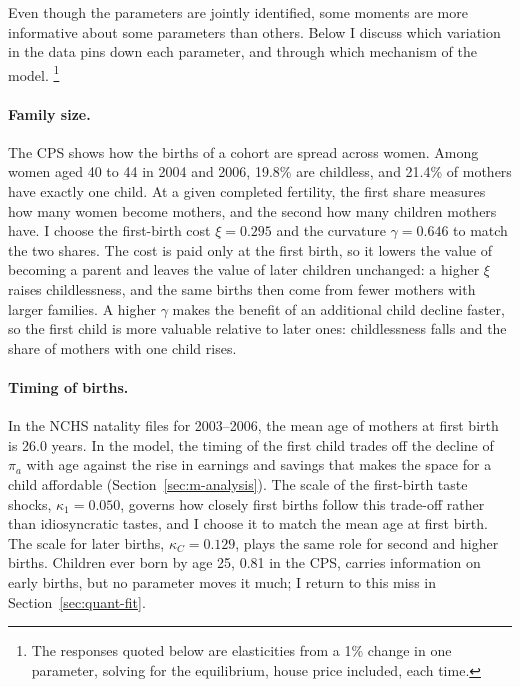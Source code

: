 Even though the parameters are jointly identified, some moments are more
informative about some parameters than others. Below I discuss which
variation in the data pins down each parameter, and through which mechanism
of the model.%
\footnote{The responses quoted below are elasticities from a 1\% change in
one parameter, solving for the equilibrium, house price included, each
time.}

\paragraph{Family size.}
The CPS shows how the births of a cohort are spread across women. Among
women aged 40 to 44 in 2004 and 2006, 19.8\% are childless, and 21.4\% of
mothers have exactly one child. At a given completed fertility, the first
share measures how many women become mothers, and the second how many
children mothers have. I choose the first-birth cost $\xi=0.295$ and the
curvature $\gamma=0.646$ to match the two shares. The cost is paid only at
the first birth, so it lowers the value of becoming a parent and leaves the
value of later children unchanged: a higher $\xi$ raises childlessness, and
the same births then come from fewer mothers with larger families. A higher
$\gamma$ makes the benefit of an additional child decline faster, so the
first child is more valuable relative to later ones: childlessness falls and
the share of mothers with one child rises.

\paragraph{Timing of births.}
In the NCHS natality files for 2003--2006, the mean age of mothers at first
birth is 26.0 years. In the model, the timing of the first child trades off
the decline of $\pi_a$ with age against the rise in earnings and savings
that makes the space for a child affordable (Section~\ref{sec:m-analysis}).
The scale of the first-birth taste shocks, $\kappa_1=0.050$, governs how
closely first births follow this trade-off rather than idiosyncratic tastes,
and I choose it to match the mean age at first birth. The scale for later
births, $\kappa_C=0.129$, plays the same role for second and higher births.
Children ever born by age 25, 0.81 in the CPS, carries information on early
births, but no parameter moves it much; I return to this miss in
Section~\ref{sec:quant-fit}.

